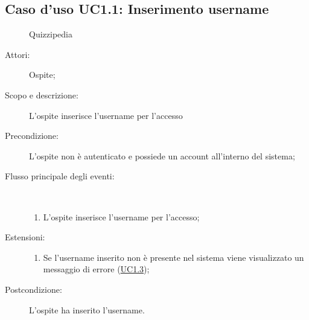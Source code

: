 \subsection{Caso d'uso UC1.1: Inserimento username}
	\begin{figure}[H]
		\centering
		\begin{resizedtikzpicture}{\textwidth}
		\begin{umlsystem}[x=0, fill=lightgray!20]{Quizzipedia}
		\end{umlsystem}
		\end{resizedtikzpicture}
		\caption{}
	\end{figure}
\begin{description}
\item[Attori:] Ospite;
\item[Scopo e descrizione:] L'ospite inserisce l'username per l'accesso
      \item[Precondizione:] L'ospite non è autenticato e possiede un account all'interno del sistema;

        \item[Flusso principale degli eventi:] \ 
 \begin{enumerate}
          \item L'ospite inserisce l'username per l'accesso;

      \end{enumerate}
    \item[Estensioni:]
      \begin{enumerate}
          \item Se l'username inserito non è presente nel sistema viene visualizzato un messaggio di errore (\hyperlink{UC1.3}{UC1.3});

      \end{enumerate}
    \item[Postcondizione:] L'ospite ha inserito l'username.
  \end{description}
\hypertarget{UC1.2}{}

